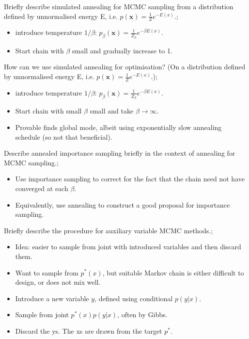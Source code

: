 \documentclass{article}
\begin{document}
Briefly describe simulated annealing for MCMC sampling from a distribution defined by unnormalised energy E, i.e. $p(\mathbf{x}) = \frac{1}{Z}e^{-E(x)}$.; \begin{itemize} \item introduce temperature $1/\beta$: $p_\beta(\mathbf{x}) = \frac{1}{Z_{\beta}}e^{-\beta E(x)}$. \item Start chain with $\beta$ small and gradually increase to 1. \end{itemize}

How can we use simulated annealing for optimisation? (On a distribution defined by unnormalised energy E, i.e. $p(\mathbf{x}) = \frac{1}{Z}e^{-E(x)}$.); \begin{itemize} \item introduce temperature $1/\beta$: $p_\beta(\mathbf{x}) = \frac{1}{Z_{\beta}}e^{-\beta E(x)}$. \item Start chain with small $\beta$ small and take $\beta\to \infty$. \item Provable finds global mode, albeit using exponentially slow annealing schedule (so not that beneficial). \end{itemize}

Describe annealed importance sampling briefly in the context of annealing for MCMC sampling.; \begin{itemize} \item Use importance sampling to correct for the fact that the chain need not have converged at each $\beta$. \item Equivalently, use annealing to construct a good proposal for importance sampling. \end{itemize}

Briefly describe the procedure for auxiliary variable MCMC methods.; \begin{itemize} \item Idea: easier to sample from joint with introduced variables and then discard them. \item Want to sample from $p^*(x)$, but suitable Markov chain is either difficult to design, or does not mix well. \item Introduce a new variable $y$, defined using conditional $p(y|x)$. \item Sample from joint $p^*(x)p(y|x)$, often by Gibbs. \item Discard the ys. The xs are drawn from the target $p^*$. \end{itemize}
\end{document}
